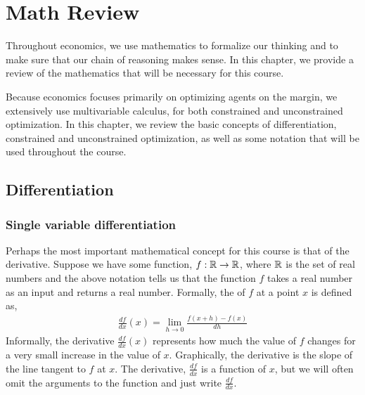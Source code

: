 \chapter{Math Review}
Throughout economics, we use mathematics to formalize our thinking and to make sure that our chain of reasoning makes sense. In this chapter, we provide a review of the mathematics that will be necessary for this course.

Because economics focuses primarily on optimizing agents on the margin, we extensively use multivariable calculus, for both constrained and unconstrained optimization. In this chapter, we review the basic concepts of differentiation, constrained and unconstrained optimization, as well as some notation that will be used throughout the course. 

\section{Differentiation}
\subsection*{Single variable differentiation}
Perhaps the most important mathematical concept for this course is that of the derivative. Suppose we have some function, $f: \mathbb{R} \to \mathbb{R}$, where $\mathbb{R}$ is the set of real numbers and the above notation tells us that the function $f$ takes a real number as an input and returns a real number. Formally, the  of $f$ at a point $x$ is defined as,
\begin{align*}
    \frac{df}{dx}(x) = \lim_{h \to 0} \frac{f(x + h) - f(x)}{dh}
\end{align*}
Informally, the derivative $\frac{df}{dx}(x)$ represents how much the value of $f$ changes for a very small increase in the value of $x$. Graphically, the derivative is the slope of the line tangent to $f$ at $x$. The derivative, $\frac{df}{dx}$ is a function of $x$, but we will often omit the arguments to the function and just write $\frac{df}{dx}$. 

